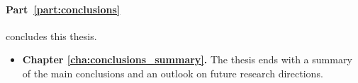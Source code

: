 \paragraph{\textbf{Part~\ref{part:conclusions}}} concludes this thesis.

\begin{itemize}
\item \textbf{Chapter \ref{cha:conclusions_summary}.} The thesis ends with a summary of the main conclusions and an outlook on future research directions.
\end{itemize}

